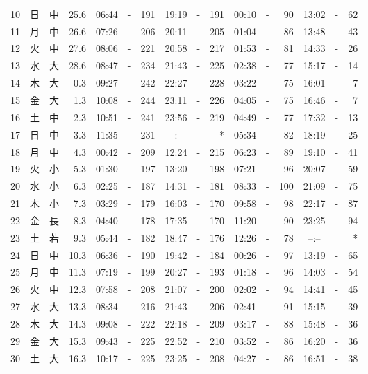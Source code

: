 \documentclass[12pt.a4j]{jsarticle}
\begin{document}
\begin{center}
\begin{table}[ht]
\begin{tabular}{|rc|cr|ccrccr|ccrccr|}
10 & 日 & 中 & 25.6 & 06:44 &-& 191 & 19:19 &-& 191 & 00:10 &-&  90 & 13:02 &-&  62 \\
11 & 月 & 中 & 26.6 & 07:26 &-& 206 & 20:11 &-& 205 & 01:04 &-&  86 & 13:48 &-&  43 \\
12 & 火 & 中 & 27.6 & 08:06 &-& 221 & 20:58 &-& 217 & 01:53 &-&  81 & 14:33 &-&  26 \\
13 & 水 & 大 & 28.6 & 08:47 &-& 234 & 21:43 &-& 225 & 02:38 &-&  77 & 15:17 &-&  14 \\
14 & 木 & 大 &  0.3 & 09:27 &-& 242 & 22:27 &-& 228 & 03:22 &-&  75 & 16:01 &-&   7 \\
15 & 金 & 大 &  1.3 & 10:08 &-& 244 & 23:11 &-& 226 & 04:05 &-&  75 & 16:46 &-&   7 \\
16 & 土 & 中 &  2.3 & 10:51 &-& 241 & 23:56 &-& 219 & 04:49 &-&  77 & 17:32 &-&  13 \\
17 & 日 & 中 &  3.3 & 11:35 &-& 231 & --:-- & &  *  & 05:34 &-&  82 & 18:19 &-&  25 \\
18 & 月 & 中 &  4.3 & 00:42 &-& 209 & 12:24 &-& 215 & 06:23 &-&  89 & 19:10 &-&  41 \\
19 & 火 & 小 &  5.3 & 01:30 &-& 197 & 13:20 &-& 198 & 07:21 &-&  96 & 20:07 &-&  59 \\
20 & 水 & 小 &  6.3 & 02:25 &-& 187 & 14:31 &-& 181 & 08:33 &-& 100 & 21:09 &-&  75 \\
21 & 木 & 小 &  7.3 & 03:29 &-& 179 & 16:03 &-& 170 & 09:58 &-&  98 & 22:17 &-&  87 \\
22 & 金 & 長 &  8.3 & 04:40 &-& 178 & 17:35 &-& 170 & 11:20 &-&  90 & 23:25 &-&  94 \\
23 & 土 & 若 &  9.3 & 05:44 &-& 182 & 18:47 &-& 176 & 12:26 &-&  78 & --:-- & &  *  \\
24 & 日 & 中 & 10.3 & 06:36 &-& 190 & 19:42 &-& 184 & 00:26 &-&  97 & 13:19 &-&  65 \\
25 & 月 & 中 & 11.3 & 07:19 &-& 199 & 20:27 &-& 193 & 01:18 &-&  96 & 14:03 &-&  54 \\
26 & 火 & 中 & 12.3 & 07:58 &-& 208 & 21:07 &-& 200 & 02:02 &-&  94 & 14:41 &-&  45 \\
27 & 水 & 大 & 13.3 & 08:34 &-& 216 & 21:43 &-& 206 & 02:41 &-&  91 & 15:15 &-&  39 \\
28 & 木 & 大 & 14.3 & 09:08 &-& 222 & 22:18 &-& 209 & 03:17 &-&  88 & 15:48 &-&  36 \\
29 & 金 & 大 & 15.3 & 09:43 &-& 225 & 22:52 &-& 210 & 03:52 &-&  86 & 16:20 &-&  36 \\
30 & 土 & 大 & 16.3 & 10:17 &-& 225 & 23:25 &-& 208 & 04:27 &-&  86 & 16:51 &-&  38 \\

\end{tabular}
\end{table}
\end{center}
\end{document}
